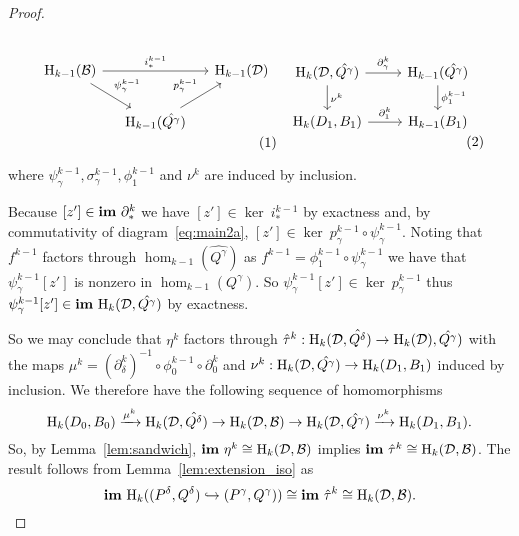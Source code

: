 \begin{proof}
  \begin{small}\begin{subequations}\label{eq:main2}
  \begin{minipage}{0.5\textwidth}\begin{equation}\label{eq:main2a}\begin{tikzcd}[column sep=small]
      \hom_{k-1}(\B)\arrow{dr}{\psi_\gamma^{k-1}}\arrow{rr}{i_*^{k-1}} & &
      \hom_{k-1}(\D)\\
    & \hom_{k-1}(\hat{Q^\gamma})\arrow{ur}{p_\gamma^{k-1}}
  \end{tikzcd}\end{equation}\end{minipage}
  \begin{minipage}{0.43\textwidth}\begin{equation}\label{eq:main2b}\begin{tikzcd}%
    \hom_{k}(\D, \hat{Q^\gamma})\arrow{r}{\partial_\gamma^k}\arrow{d}{\nu^k} &
    \hom_{k-1}(\hat{Q^\gamma})\arrow{d}{\phi_1^{k-1}}\\
    \hom_{k}(D_1, B_1)\arrow{r}{\partial_1^k} &
    \hom_{k-1}(B_1)
  \end{tikzcd}\end{equation}\end{minipage}
  \end{subequations}\end{small}\vspace{2ex}

  \noindent where $\psi_\gamma^{k-1}, \sigma_\gamma^{k-1}, \phi_1^{k-1}$ and $\nu^k$ are induced by inclusion.

  Because $[z']\in\mathbf{im}~\partial_*^k$ we have $[z']\in\ker~i_*^{k-1}$ by exactness and, by commutativity of diagram~\ref{eq:main2a}, $[z']\in \ker~p_\gamma^{k-1}\circ\psi_\gamma^{k-1}$.
  Noting that $f^{k-1}$ factors through $\hom_{k-1}(\hat{Q^\gamma})$ as $f^{k-1} = \phi_1^{k-1}\circ\psi_\gamma^{k-1}$ we have that $\psi_\gamma^{k-1}[z']$ is nonzero in $\hom_{k-1}(Q^\gamma)$.
  So $\psi_\gamma^{k-1}[z']\in\ker~p_\gamma^{k-1}$ thus $\psi_\gamma^{k-1}[z'] \in\mathbf{im}~\mathrm{H}_k({\mathcal{D}}, \hat{Q^\gamma})$ by exactness.

  So we may conclude that $\eta^k$ factors through $\hat{\tau}^k : \mathrm{H}_k({\mathcal{D}}, \hat{Q^\delta})\to \mathrm{H}_k({\mathcal{D}}), \hat{Q^\gamma})$ with the maps $\mu^k = (\partial^k_\delta)^{-1}\circ \phi_0^{k-1}\circ\partial_0^k$ and $\nu^k : \mathrm{H}_k({\mathcal{D}}, \hat{Q^\gamma}) \to \mathrm{H}_k(D_1, B_1)$ induced by inclusion.
  We therefore have the following sequence of homomorphisms
  \[ \mathrm{H}_k(D_0, B_0)\xrightarrow{\mu^k} \mathrm{H}_k({\mathcal{D}}, \hat{Q^\delta})\to\mathrm{H}_k({\mathcal{D}}, {\mathcal{B}})\to\mathrm{H}_k({\mathcal{D}}, \hat{Q^\gamma})\xrightarrow{\nu^k} \mathrm{H}_k(D_1, B_1).\]
  So, by Lemma~\ref{lem:sandwich}, $\mathbf{im}~\eta^k\cong \mathrm{H}_k({\mathcal{D}}, {\mathcal{B}})$ implies $\mathbf{im}~\hat{\tau}^k\cong \mathrm{H}_k({\mathcal{D}}, {\mathcal{B}})$.
  The result follows from Lemma~\ref{lem:extension_iso} as
  \[ \mathbf{im}~\mathrm{H}_k((P^\delta, Q^\delta)\hookrightarrow (P^\gamma, Q^\gamma))\cong\mathbf{im}~\hat{\tau}^k\cong \mathrm{H}_k({\mathcal{D}}, {\mathcal{B}}).\]
\end{proof}

